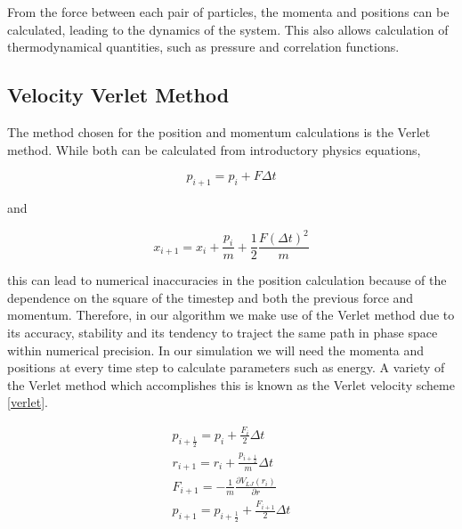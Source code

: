 \documentclass{article}
\begin{document}
\begin{multicols}{2}
\noindent From the force between each pair of particles, the momenta and positions can be calculated, leading to the dynamics of the system.  This also allows calculation of thermodynamical quantities, such as pressure and correlation functions.\\

\subsection{Velocity Verlet Method}

The method chosen for the position and momentum calculations is the Verlet method.  While both can be calculated from introductory physics equations,

\begin{equation}
\label{momeqn}
p_{i+1}=p_i + F \Delta t
\end{equation}

\noindent and

\begin{equation}
\label{poseqn}
x_{i+1} = x_i + \frac{p_i}{m} + \frac{1}{2}\frac{F(\Delta t)^2}{m}
\end{equation}

\noindent this can lead to numerical inaccuracies in the position calculation because of the dependence on the square of the timestep and both the previous force and momentum. Therefore, in our algorithm we make use of the Verlet method due to its accuracy, stability and its tendency to traject the same path in phase space within numerical precision. In our simulation we will need the momenta and positions at every time step to calculate parameters such as energy. A variety of the Verlet method which accomplishes this is known as the Verlet velocity scheme \ref{verlet}.


\begin{equation}
\label{verletvscheme}
\begin{split}
p_{i+\frac{1}{2}}=p_i + \frac{F_i}{2} \Delta t \\
r_{i+1}=r_i+\frac{p_{i+\frac{1}{2}}}{m} \Delta t \\
F_{i+1}=-\frac{1}{m} \frac{\partial V_{LJ}(r_i)}{\partial r} \\
p_{i+1} = p_{i+\frac{1}{2}} + \frac{F_{i+1}}{2} \Delta t \\
\end{split}
\end{equation}


\end{multicols}
\end{document}
